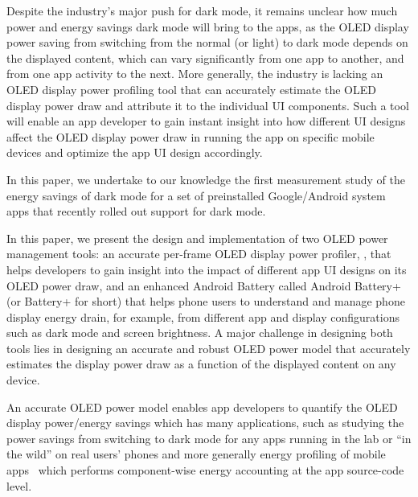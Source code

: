 Despite the industry's major push for dark mode, it remains unclear
how much power and energy savings dark mode will bring to the apps, as
the OLED display power saving from switching from the normal (or
light) to dark mode depends on the displayed content, which can vary
significantly from one app to another, and from one app activity to
the next. More generally, the industry is lacking an OLED display
power profiling tool that can accurately estimate the OLED display
power draw and attribute it to the individual UI components.  Such a
tool will enable an app developer to gain instant insight into how different
UI designs affect the OLED display power draw in running the app on
specific mobile devices and optimize the app UI design accordingly.

In this paper, we undertake to our knowledge the first measurement
study of the energy savings of dark mode for a set of preinstalled Google/Android system
apps that recently rolled out support for dark mode.
\fi

In this paper, we present the design and implementation
of two OLED power management tools:
an accurate per-frame OLED display power profiler, \namee, that helps
developers to gain insight into the impact of different app UI designs
on its OLED power draw, and an enhanced Android Battery called Android Battery+ 
(or Battery+ for short) that
helps phone users to understand and manage phone
display energy drain, for example, from different app and display
configurations such as dark mode and screen brightness. A major challenge in
designing both tools lies
in designing an accurate and robust
OLED power model that accurately estimates the display power draw
as a function of the displayed content on any device.

An accurate OLED power model enables app developers to
quantify the OLED display power/energy savings which has many
applications, such as studying the power savings from switching to
dark mode for any apps running in the lab or ``in the wild'' on real
users' phones
and more generally energy profiling of mobile
apps~\cite{appscope,zhang2010accurate,shye2009into,pathak:eurosys12,mittal:mobicom12,androidprofiler}
which performs component-wise energy accounting at the app source-code
level.
\fi


